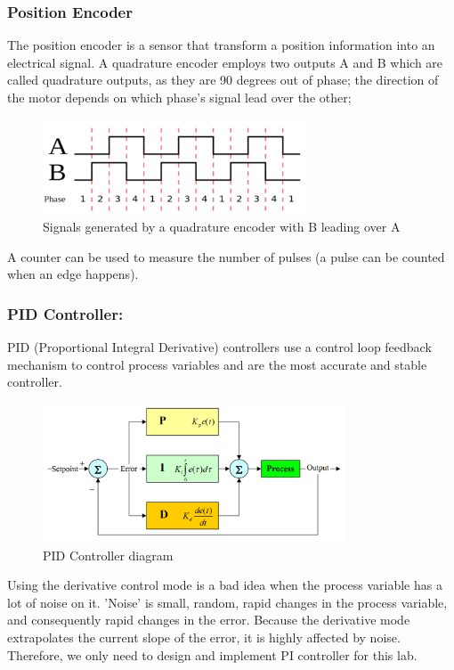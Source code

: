 \documentclass[english]{article}
\begin{document}
\subsubsection{Position Encoder}
The position encoder is a sensor that transform a position information into an 
electrical signal. A quadrature encoder employs two outputs A and B which are called 
quadrature outputs, as they are 90 degrees out of phase; the direction of the motor 
depends on which phase’s signal lead over the other;  
\begin{figure}[!h]
    \centering
    \includegraphics[width=0.70\textwidth, height=0.20\textheight]{figures/Encoder.png}
    \caption{Signals generated by a quadrature encoder with B leading over A }
    \label{fig:Enc}
\end{figure} \newline 
A counter can be used to measure the number of pulses 
(a pulse can be counted when an edge happens). 
\subsubsection{PID Controller:}
PID (Proportional Integral Derivative) controllers use a control loop feedback 
mechanism to control process variables and are the most accurate and stable controller.
\begin{figure}[!h]
    \centering
    \includegraphics[width=0.80\textwidth, height=0.25\textheight]{figures/PID.png}
    \caption{PID Controller diagram }
    \label{fig:windup}
\end{figure}
Using the derivative control mode is a bad idea when the process variable has a lot
 of noise on it. 'Noise' is small, random, rapid changes in the process variable,
  and consequently rapid changes in the error. Because the derivative mode extrapolates
   the current slope of the error, it is highly affected by noise. Therefore, we only
    need to design and implement PI controller for this lab.
\end{document}
